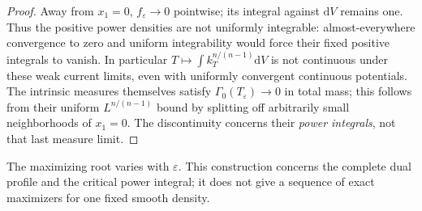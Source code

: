 \begin{proof}
Away from $x_1=0$, $f_\varepsilon\to0$ pointwise; its integral
against $\mathrm dV$ remains one. Thus the positive power densities are not
uniformly integrable: almost-everywhere convergence to zero and
uniform integrability would force their fixed positive integrals to
vanish. In particular $T\mapsto\int k_T^{n/(n-1)}\mathrm dV$ is not
continuous under these weak current limits, even with uniformly
convergent continuous potentials. The intrinsic measures
themselves satisfy $\Gamma_0(T_\varepsilon)\to0$ in total mass;
this follows from their uniform $L^{n/(n-1)}$ bound by splitting
off arbitrarily small neighborhoods of $x_1=0$. The discontinuity
concerns their \emph{power integrals}, not that last measure limit.
\end{proof}

The maximizing root varies with $\varepsilon$. This construction concerns the complete dual profile and the critical power integral; it does not give a sequence of exact maximizers for one fixed smooth density.
